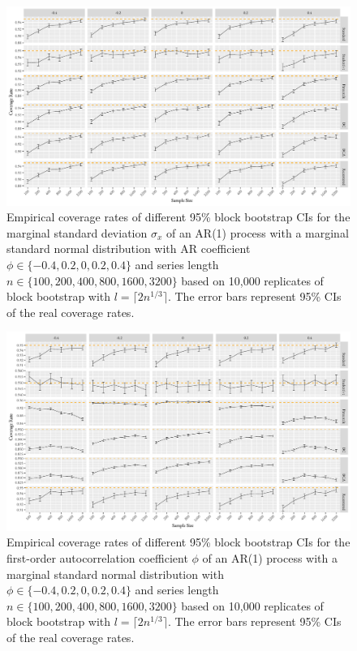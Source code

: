 \documentclass[10pt]{article}
\begin{document}
\begin{figure}[bp]
  \centering
  \includegraphics[width=\textwidth]{figures/plot_norm_sigma_2}
  \caption{Empirical coverage rates of different 95\% block bootstrap CIs for
    the marginal standard deviation $\sigma_x$ of an AR(1) process with a
    marginal standard normal distribution with AR 
    coefficient $\phi \in \{-0.4, 0.2, 0, 0.2, 0.4\}$ and series length 
    $n \in \{100, 200, 400, 800, 1600, 3200\}$ based on 10,000 replicates of
    block bootstrap with $l = \lceil 2n^{1/3} \rceil$. The 
    error bars represent 95\% CIs of the real coverage rates.}
  \label{fig:sigma2}
\end{figure}


\begin{figure}[tbp]
  \centering
  \includegraphics[width=\textwidth]{figures/plot_norm_phi_2}
  \caption{Empirical coverage rates of different 95\% block bootstrap CIs for 
    the first-order autocorrelation coefficient $\phi$ of an AR(1) process with 
    a marginal standard normal distribution with 
    $\phi \in \{-0.4, 0.2, 0, 0.2, 0.4\}$ and series length
    $n \in \{100, 200, 400, 800, 1600, 3200\}$ based on 10,000 replicates of
    block bootstrap with $l = \lceil 2n^{1/3} \rceil$. The
    error bars represent 95\% CIs of the real coverage rates.}
  \label{fig:phi2}
\end{figure}
\end{document}
